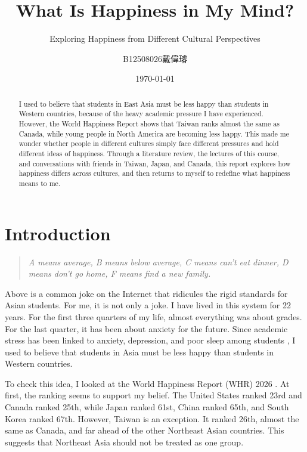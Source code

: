 \documentclass[12pt,a4paper]{article}
\title{What Is Happiness in My Mind?}
\subtitle{Exploring Happiness from Different Cultural Perspectives}
\author{B12508026戴偉璿}
\date{\today}
\begin{document}
\maketitle

\newpage
\tableofcontents
\newpage


\begin{abstract}
I used to believe that students in East Asia must be less happy than
students in Western countries, because of the heavy academic pressure I
have experienced. However, the World Happiness Report shows that Taiwan
ranks almost the same as Canada, while young people in North America are
becoming less happy. This made me wonder whether people in different
cultures simply face different pressures and hold different ideas of
happiness. Through a literature review, the lectures of this course, and
conversations with friends in Taiwan, Japan, and Canada, this report
explores how happiness differs across cultures, and then returns to
myself to redefine what happiness means to me.
\end{abstract}
\section{Introduction}

\begin{quote}
\emph{A means average, B means below average, C means can't eat dinner,
D means don't go home, F means find a new family.}
\end{quote}

Above is a common joke on the Internet that ridicules the rigid standards for Asian students.
For me, it is not only a joke.
I have lived in this system for 22 years.
For the first three quarters of my life, almost everything was about grades.
For the last quarter, it has been about anxiety for the future.
Since academic stress has been linked to anxiety, depression, and poor sleep among students \parencite{pascoe2020impact}, I used to believe that students in Asia must be less happy than students in Western countries.

To check this idea, I looked at the World Happiness Report (WHR) 2026 \parencite{helliwell2026world}.
At first, the ranking seems to support my belief.
The United States ranked 23rd and Canada ranked 25th, while Japan ranked 61st, China ranked 65th, and South Korea ranked 67th.
However, Taiwan is an exception.
It ranked 26th, almost the same as Canada, and far ahead of the other Northeast Asian countries.
This suggests that Northeast Asia should not be treated as one group.
\end{document}
